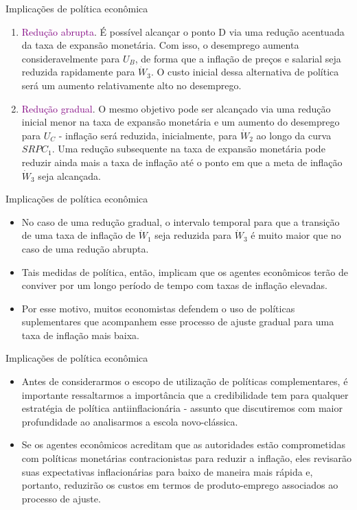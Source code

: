 \documentclass[10pt]{beamer}
\begin{document}
\begin{frame}{Implicações de política econômica}
    \begin{enumerate}
        \item \textcolor{purple}{Redução abrupta}. É possível alcançar o ponto D via uma redução acentuada da taxa de expansão monetária. Com isso, o desemprego aumenta consideravelmente para $U_B$, de forma que a inflação de preços e salarial seja reduzida rapidamente para $\dot{W}_3$. O custo inicial dessa alternativa de política será um aumento relativamente alto no desemprego.
        \bigskip
        \item \textcolor{purple}{Redução gradual}. O mesmo objetivo pode ser alcançado via uma redução inicial menor na taxa de expansão monetária e um aumento do desemprego para $U_C$ - inflação será reduzida, inicialmente, para $\dot{W}_2$ ao longo da curva $SRPC_1$. Uma redução subsequente na taxa de expansão monetária pode reduzir ainda mais a taxa de inflação até o ponto em que a meta de inflação $\dot{W}_3$ seja alcançada.
    \end{enumerate}    
\end{frame}

\begin{frame}{Implicações de política econômica}
    \begin{itemize}
        \item No caso de uma redução gradual, o intervalo temporal para que a transição de uma taxa de inflação de $\dot{W}_1$ seja reduzida para $\dot{W}_3$ é muito maior que no caso de uma redução abrupta.
        \bigskip
        \item Tais medidas de política, então, implicam que os agentes econômicos terão de conviver por um longo período de tempo com taxas de inflação elevadas.
        \bigskip
        \item Por esse motivo, muitos economistas defendem o uso de políticas suplementares que acompanhem esse processo de ajuste gradual para uma taxa de inflação mais baixa.
    \end{itemize}    
\end{frame}

\begin{frame}{Implicações de política econômica}
    \begin{itemize}
        \item Antes de considerarmos o escopo de utilização de políticas complementares, é importante ressaltarmos a importância que a credibilidade tem para qualquer estratégia de política antiinflacionária - assunto que discutiremos com maior profundidade ao analisarmos a escola novo-clássica.
        \bigskip
        \item Se os agentes econômicos acreditam que as autoridades estão comprometidas com políticas monetárias contracionistas para reduzir a inflação, eles revisarão suas expectativas inflacionárias para baixo de maneira mais rápida e, portanto, reduzirão os custos em termos de produto-emprego associados ao processo de ajuste.
    \end{itemize}    
\end{frame}
\end{document}
